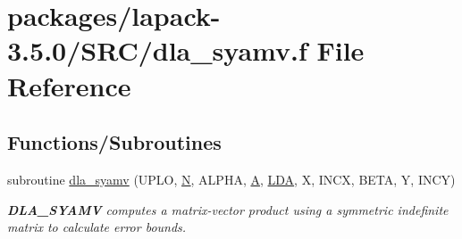 \hypertarget{dla__syamv_8f}{}\section{packages/lapack-\/3.5.0/\+S\+R\+C/dla\+\_\+syamv.f File Reference}
\label{dla__syamv_8f}
\subsection*{Functions/\+Subroutines}
\begin{DoxyCompactItemize}
\item 
subroutine \hyperlink{group__doubleSYcomputational_gae6960d344f10c9e0a2d1ba83c571a521}{dla\+\_\+syamv} (U\+P\+L\+O, \hyperlink{polmisc_8c_a0240ac851181b84ac374872dc5434ee4}{N}, A\+L\+P\+H\+A, \hyperlink{classA}{A}, \hyperlink{example__user_8c_ae946da542ce0db94dced19b2ecefd1aa}{L\+D\+A}, X, I\+N\+C\+X, B\+E\+T\+A, Y, I\+N\+C\+Y)
\begin{DoxyCompactList}\small\item\em {\bfseries D\+L\+A\+\_\+\+S\+Y\+A\+M\+V} computes a matrix-\/vector product using a symmetric indefinite matrix to calculate error bounds. \end{DoxyCompactList}\end{DoxyCompactItemize}
